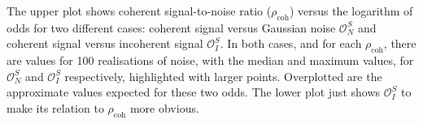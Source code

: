 \label{fig:approx_odds}
The upper plot shows coherent signal-to-noise ratio ($\rho_{\text{coh}}$) versus the logarithm of odds for
two different cases: coherent signal versus Gaussian noise $\mathcal{O}^S_N$ and coherent signal versus
incoherent signal $\mathcal{O}^S_I$. In both cases, and for each $\rho_{\text{coh}}$, there are values for
100 realisations of noise, with the median and maximum values, for $\mathcal{O}^S_N$ and $\mathcal{O}^S_I$
respectively, highlighted with larger points. Overplotted are the approximate values expected for these two
odds. The lower plot just shows $\mathcal{O}^S_I$ to make its relation to $\rho_{\text{coh}}$ more obvious.
